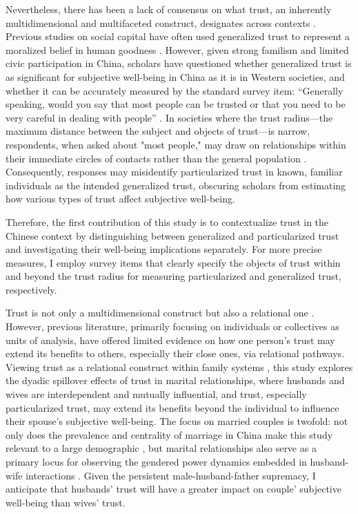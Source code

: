 Nevertheless, there has been a lack of consensus on what trust, an inherently multidimensional and multifaceted construct, designates across contexts \parencite{nannestadWhatHaveWe2008}. Previous studies on social capital have often used generalized trust to represent a moralized belief in human goodness \parencite{adedejiExaminingPathwaysGeneral2023,helliwellHowsLifeCombining2003,helliwellSocialContextWell2004}. However, given strong familism and limited civic participation in China, scholars have questioned whether generalized trust is as significant for subjective well-being in China as it is in Western societies, and whether it can be accurately measured by the standard survey item: “Generally speaking, would you say that most people can be trusted or that you need to be very careful in dealing with people” \parencite{delheyHowGeneralTrust2011,liParticularizedTrustGeneralized2002}. In societies where the trust radius—the maximum distance between the subject and objects of trust—is narrow, respondents, when asked about "most people," may draw on relationships within their immediate circles of contacts rather than the general population \parencite{liParticularizedTrustGeneralized2002}. Consequently, responses may misidentify particularized trust in known, familiar individuals as the intended generalized trust, obscuring scholars from estimating how various types of trust affect subjective well-being.

Therefore, the first contribution of this study is to contextualize trust in the Chinese context by distinguishing between generalized and particularized trust and investigating their well-being implications separately. For more precise measures, I employ survey items that clearly specify the objects of trust within and beyond the trust radius for measuring particularized and generalized trust, respectively.

Trust is not only a multidimensional construct but also a relational one \parencite{lewisTrustSocialReality1985}. However, previous literature, primarily focusing on individuals or collectives as units of analysis, have offered limited evidence on how one person's trust may extend its benefits to others, especially their close ones, via relational pathways. Viewing trust as a relational construct within family systems \parencite{bowenUseFamilyTheory1966}, this study explores the dyadic spillover effects of trust in marital relationships, where husbands and wives are interdependent and mutually influential, and trust, especially particularized trust, may extend its benefits beyond the individual to influence their spouse's subjective well-being. The focus on married couples is twofold: not only does the prevalence and centrality of marriage in China make this study relevant to a large demographic \parencite{jiangMarriageSqueezeNeverMarried2014,yanChineseFamiliesUpside2021}, but marital relationships also serve as a primary locus for observing the gendered power dynamics embedded in husband-wife interactions \parencite{barberLogicLimitsTrust1983,jiUnequalCareUnequal2017}. Given the persistent male-husband-father supremacy, I anticipate that husbands' trust will have a greater impact on couple' subjective well-being than wives' trust.


